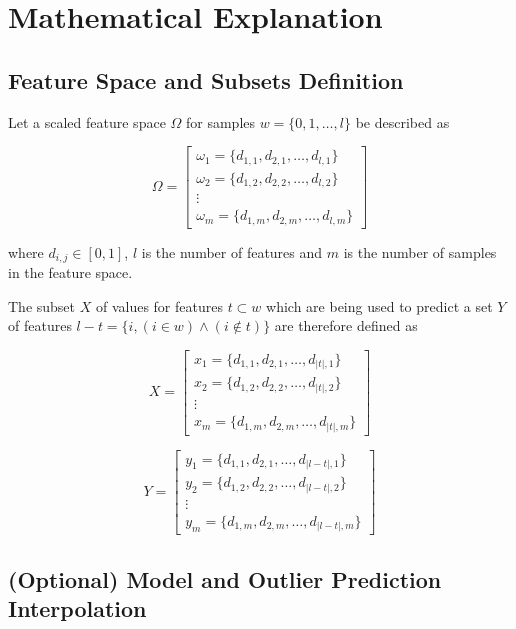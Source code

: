 \documentclass[a4paper, twocolumn]{article}
\begin{document}
\section{Mathematical Explanation}

\subsection{Feature Space and Subsets Definition}

Let a scaled feature space $\Omega$ for samples $w = \{0, 1, \ldots, l\}$ be described as

$$\Omega =
\begin{bmatrix}
{\omega_1 = \{d_{1, 1}, d_{2, 1}, \ldots, d_{l, 1}\}} \\
{\omega_2 = \{d_{1, 2}, d_{2, 2}, \ldots, d_{l, 2}\}} \\
\vdots \\
{\omega_m = \{d_{1, m}, d_{2, m}, \ldots, d_{l, m}\}}
\end{bmatrix}
$$

where $d_{i, j} \in [0,1]$, $l$ is the number of features and $m$ is the number of samples in the feature space.

The subset $X$ of values for features $t \subset w$ which are being used to predict a set $Y$ of features $l - t = \{i, (i \in w) \land (i \notin t)\}$ are therefore defined as

$$X =
\begin{bmatrix}
{x_1 = \{d_{1, 1}, d_{2, 1}, \ldots, d_{|t|, 1}\}} \\
{x_2 = \{d_{1, 2}, d_{2, 2}, \ldots, d_{|t|, 2}\}} \\
\vdots \\
{x_m = \{d_{1, m}, d_{2, m}, \ldots, d_{|t|, m}\}}
\end{bmatrix}
$$

$$Y =
\begin{bmatrix}
{y_1 = \{d_{1, 1}, d_{2, 1}, \ldots, d_{|l-t|, 1}\}} \\
{y_2 = \{d_{1, 2}, d_{2, 2}, \ldots, d_{|l-t|, 2}\}} \\
\vdots \\
{y_m = \{d_{1, m}, d_{2, m}, \ldots, d_{|l-t|, m}\}}
\end{bmatrix}
$$

\subsection{(Optional) Model and Outlier Prediction Interpolation }\label{interpolation}
\end{document}
